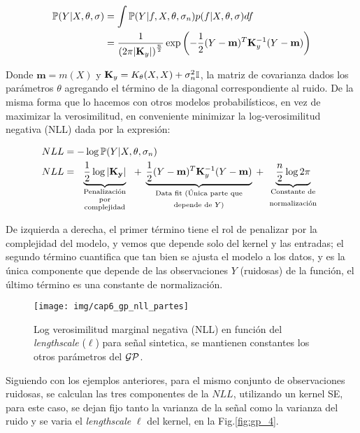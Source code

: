 \begin{align}
	\mathbb{P}(Y|X, \theta, \sigma) & = \int \mathbb{P}(Y|f, X, \theta, \sigma_n) p(f|X,\theta, \sigma) df \\
	& = \frac{1}{\left( 2\pi |\mathbf{K}_y|\right)^{\frac{n}{2}}} 
	\exp \left(
	-\frac{1}{2} (Y - \mathbf{m})^T \mathbf{K}_y^{-1} (Y - \mathbf{m})
	\right)
\end{align}

Donde $\mathbf{m}=m(X)$ y $\mathbf{K}_y=K_{\theta}(X,X) + \sigma_n^2 {\mathbb I}$, la matriz de covarianza dados los parámetros $\theta$ agregando el término de la diagonal correspondiente al ruido. De la misma forma que lo hacemos con otros modelos probabilísticos, en vez de maximizar la verosimilitud, en conveniente minimizar la log-verosimilitud negativa (NLL) dada por la expresión:

\begin{align}
	NLL & = -\log \pr(Y|X, \theta, \sigma_n) \\
	NLL & = \underbrace{ \color{black}{\frac{1}{2}\log|\mathbf{K_y}|} }_
	    {\text{\parbox{2cm}{\centering Penalización\\[-4pt] por\\[-4pt] complejidad}}}
	    + \underbrace{ \color{black}{\frac{1}{2}(Y - \mathbf{m})^T \mathbf{K}_y^{-1} (Y - \mathbf{m}) }}_
	    {\text{\parbox{4cm}{\centering Data fit (Única parte que depende de $Y$)}}}
	    + \underbrace{ \color{black}{\frac{n}{2} \log2\pi}}_
	    {\text{\parbox{2cm}{\centering Constante de normalización}}}\label{eq:gp_nll}
\end{align}

De izquierda a derecha, el primer término tiene el rol de penalizar por la complejidad del modelo, y vemos que depende solo del kernel y las entradas; el segundo término cuantifica que tan bien se ajusta el modelo a los datos, y es la única componente que depende de las observaciones $Y$ (ruidosas) de la función, el último término es una constante de normalización.\\


\begin{figure}[H]
	\centering
	\texttt{[image: img/cap6\_gp\_nll\_partes]}
	\caption{Log verosimilitud marginal negativa (NLL) en función del \textit{lengthscale} ($\ell$) para señal sintetica, se mantienen constantes los otros parámetros del $\mathcal{GP}$.}\label{fig:gp_4}
	\label{fig:nll_por partes}
\end{figure}

Siguiendo con los ejemplos anteriores, para el mismo conjunto de observaciones ruidosas, se calculan las tres componentes de la $NLL$, utilizando un kernel SE, para este caso, se dejan fijo tanto la varianza de la señal como la varianza del ruido y se varia el \textit{lengthscale} $\ell$ del kernel, en la Fig.\ref{fig:gp_4}.

